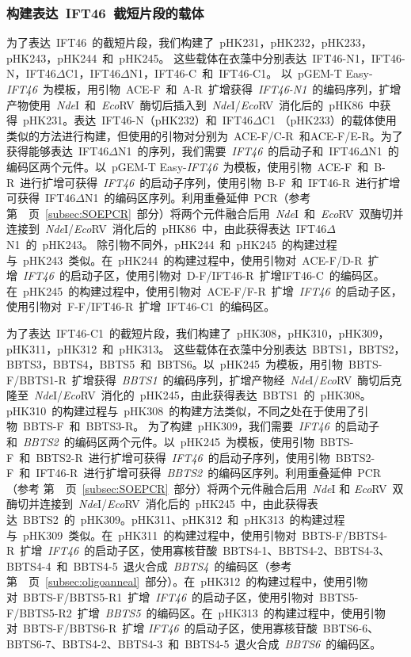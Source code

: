 \subsubsection{构建表达\ IFT46\ 截短片段的载体}
为了表达\ IFT46\ 的截短片段，我们构建了\ pHK231，pHK232，pHK233，pHK243，pHK244\ 和\ pHK245。 这些载体在衣藻中分别表达\ IFT46-N1，IFT46-N，IFT46$\Delta$C1，IFT46$\Delta$N1，IFT46-C\ 和\ IFT46-C1。 以\ pGEM-T Easy-\textit{IFT46}\ 为模板，用引物\ ACE-F\ 和\ A-R\ 扩增获得\
\textit{IFT46-N1}\ 的编码序列，扩增产物使用\ \textit{Nde}I\ 和\ \textit{Eco}RV\ 酶切后插入到\
\textit{Nde}I/\textit{Eco}RV\ 消化后的\ pHK86\ 中获得\ pHK231。表达\ IFT46-N（pHK232）和\ IFT46$\Delta$C1 （pHK233）的载体使用类似的方法进行构建，但使用的引物对分别为\ ACE-F/C-R\ 和ACE-F/E-R。为了获得能够表达\ IFT46$\Delta$N1\ 的序列，我们需要\ \textit{IFT46}\ 的启动子和\ IFT46$\Delta$N1\ 的编码区两个元件。以\ pGEM-T Easy-\textit{IFT46}\ 为模板，使用引物\ ACE-F\ 和\ B-R\ 进行扩增可获得\ \textit{IFT46}\ 的启动子序列，使用引物\ B-F\ 和\ IFT46-R\ 进行扩增可获得\ IFT46$\Delta$N1\ 的编码区序列。利用重叠延伸\ PCR（参考第\ \pageref{subsec:SOEPCR}\ 页\
\ref{subsec:SOEPCR}\ 部分）将两个元件融合后用\ \textit{Nde}I\ 和\ \textit{Eco}RV\ 双酶切并连接到\ \textit{Nde}I/\textit{Eco}RV\ 消化后的\ pHK86\ 中，由此获得表达\ IFT46$\Delta$N1\ 的\ pHK243。 除引物不同外，pHK244\ 和\ pHK245\ 的构建过程与\ pHK243\ 类似。在\ pHK244\ 的构建过程中，使用引物对\ ACE-F/D-R\ 扩增\ \textit{IFT46}\ 的启动子区，使用引物对\ D-F/IFT46-R\ 扩增IFT46-C\ 的编码区。在\ pHK245\ 的构建过程中，使用引物对\ ACE-F/F-R\ 扩增\ \textit{IFT46}\ 的启动子区，使用引物对\ F-F/IFT46-R\ 扩增\ IFT46-C1\ 的编码区。

为了表达\ IFT46-C1\ 的截短片段，我们构建了\ pHK308，pHK310，pHK309，pHK311，pHK312\ 和\ pHK313。 这些载体在衣藻中分别表达\ BBTS1，BBTS2，BBTS3，BBTS4，BBTS5\ 和\ BBTS6。以\ pHK245\ 为模板，用引物\ BBTS-F/BBTS1-R\ 扩增获得\ \textit{BBTS1}\ 的编码序列，扩增产物经\
\textit{Nde}I/\textit{Eco}RV\ 酶切后克隆至\ \textit{Nde}I/\textit{Eco}RV\ 消化的\ pHK245，由此获得表达\ BBTS1\ 的\ pHK308。pHK310\ 的构建过程与\ pHK308\ 的构建方法类似，不同之处在于使用了引物\ BBTS-F\ 和\ BBTS3-R。 为了构建\ pHK309，我们需要\ \textit{IFT46}\ 的启动子和\ \textit{BBTS2}\ 的编码区两个元件。以\ pHK245\ 为模板，使用引物\ BBTS-F\ 和\ BBTS2-R\ 进行扩增可获得\ \textit{IFT46}\ 的启动子序列，使用引物\ BBTS2-F\ 和\ IFT46-R\ 进行扩增可获得\ \textit{BBTS2}\ 的编码区序列。利用重叠延伸\ PCR （参考
第\ \pageref{subsec:SOEPCR}\ 页\ \ref{subsec:SOEPCR}\ 部分）将两个元件融合后用\ \textit{Nde}I 和
\textit{Eco}RV\ 双酶切并连接到\ \textit{Nde}I/\textit{Eco}RV\ 消化后的\ pHK245\ 中，由此获得表达\ BBTS2\ 的\ pHK309。pHK311、pHK312\ 和\ pHK313\ 的构建过程与\ pHK309\ 类似。在\ pHK311\ 的构建过程中，使用引物对\ BBTS-F/BBTS4-R\ 扩增\ \textit{IFT46}\ 的启动子区，使用寡核苷酸\ BBTS4-1、BBTS4-2、BBTS4-3、BBTS4-4\ 和\ BBTS4-5\ 退火合成\ \textit{BBTS4}\ 的编码区（参考
第\ \pageref{subsec:oligoanneal}\ 页\ \ref{subsec:oligoanneal}\ 部分）。在\ pHK312\ 的构建过程中，使用引物对\ BBTS-F/BBTS5-R1\ 扩增\ \textit{IFT46}\ 的启动子区，使用引物对\ BBTS5-F/BBTS5-R2\ 扩增\ \textit{BBTS5}\ 的编码区。在\ pHK313\ 的构建过程中，使用引物对\ BBTS-F/BBTS6-R\ 扩增
\textit{IFT46}\ 的启动子区，使用寡核苷酸\ BBTS6-6、BBTS6-7、BBTS4-2、BBTS4-3\ 和\ BBTS4-5\ 退火合成\ \textit{BBTS6}\ 的编码区。


